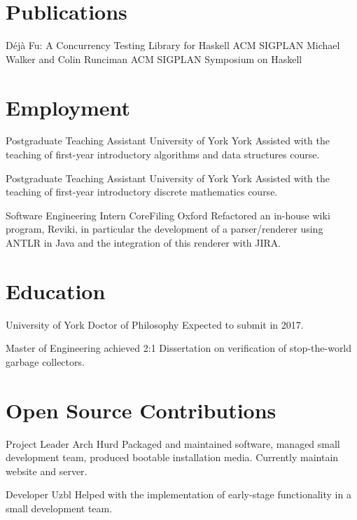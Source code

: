 \documentclass[a4paper]{cv}
\begin{document}
\section{Publications}

  {Déjà Fu: A Concurrency Testing Library for Haskell}
  {ACM SIGPLAN}
  {Michael Walker and Colin Runciman}
  {ACM SIGPLAN Symposium on Haskell}

\section{Employment}

  {Postgraduate Teaching Assistant}
  {University of York}
  {York}
  {Assisted with the teaching of first-year introductory algorithms and
    data structures course.}

  {Postgraduate Teaching Assistant}
  {University of York}
  {York}
  {Assisted with the teaching of first-year introductory discrete mathematics course.}

  {Software Engineering Intern}
  {CoreFiling}
  {Oxford}
  {Refactored an in-house wiki program, Reviki, in particular the
    development of a parser/renderer using ANTLR in Java and the
    integration of this renderer with JIRA.}

\section{Education}

\begin{educated}{University of York}
  {Doctor of Philosophy}
  {}
  {Expected to submit in 2017.}

  {Master of Engineering}
  {achieved 2:1}
  {Dissertation on verification of stop-the-world garbage collectors.}
\end{educated}

\section{Open Source Contributions}

  {Project Leader}
  {Arch Hurd}
  {Packaged and maintained software, managed small development team,
    produced bootable installation media. Currently maintain website
    and server.}
  {}

  {Developer}
  {Uzbl}
  {Helped with the implementation of early-stage functionality in a
    small development team.}
  {}
\end{document}
